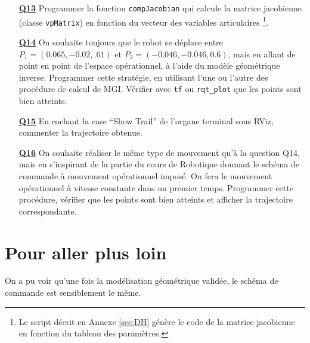 \documentclass[12pt,a4paper]{article}
\begin{document}
\begin{itemize}
\medskip\item[\textbf{\underline{Q13}}] Programmer la fonction \texttt{compJacobian} qui calcule la matrice jacobienne (classe \linebreak  \texttt{vpMatrix}) en fonction du vecteur des variables articulaires \footnote{Le script décrit en Annexe \ref{sec:DH} génère le code de la matrice jacobienne en fonction du tableau des paramètres.}.

\medskip\item[\textbf{\underline{Q14}}] On souhaite toujours que le robot se déplace entre $P_1=(0.065,-0.02,.61)$ et \linebreak $P_2=(-0.046, -0.046,  0.6)$, mais en allant de point en point de l'espace opérationnel, à l'aide du modèle géométrique inverse.
Programmer cette stratégie, en utilisant l'une ou l'autre des procédure de calcul de MGI.
Vérifier avec  \texttt{tf} ou  \texttt{rqt\_plot} que les points sont bien atteints.

\medskip\item[\textbf{\underline{Q15}}] En cochant la case ``Show Trail'' de l'organe terminal sous RViz, commenter la trajectoire obtenue.

\medskip\item[\textbf{\underline{Q16}}] On souhaite réaliser le même type de mouvement qu'à la question Q14, mais 
en s'inspirant de la partie du cours de Robotique donnant le schéma de commande à mouvement opérationnel imposé. On fera le mouvement opérationnel à vitesse constante dans un premier temps. Programmer cette procédure, vérifier que les points sont bien atteints et afficher la trajectoire correspondante.


\end{itemize}

\newpage
\section{Pour aller plus loin}

On a pu voir qu'une fois la modélisation géométrique validée, le schéma de commande est sensiblement le même. 
\end{document}
